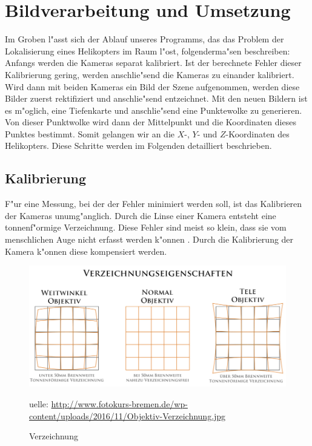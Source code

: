 \chapter{Bildverarbeitung und Umsetzung}
\label{cha:verarbeitungumsetzung}

Im Groben l"asst sich der Ablauf unseres Programms,
das das Problem der Lokalisierung eines Helikopters im Raum l"ost, folgenderma"sen beschreiben:\newline
Anfangs werden die Kameras separat kalibriert. Ist der berechnete Fehler dieser Kalibrierung gering, werden anschlie"send die Kameras zu einander kalibriert. Wird dann mit beiden Kameras ein Bild der Szene aufgenommen, werden diese Bilder zuerst rektifiziert und anschlie"send entzeichnet. Mit den neuen Bildern ist es m"oglich, eine Tiefenkarte und anschlie"send eine Punktewolke zu generieren. Von dieser Punktwolke wird dann der Mittelpunkt und die Koordinaten dieses Punktes bestimmt. Somit gelangen wir an die $X$-, $Y$- und $Z$-Koordinaten des Helikopters.\newline
Diese Schritte werden im Folgenden detailliert beschrieben.

\section{Kalibrierung}
\label{sec:kalibrierung}

F"ur eine Messung, bei der der Fehler minimiert werden soll, ist das Kalibrieren der Kameras unumg"anglich. Durch die Linse einer Kamera entsteht eine tonnenf"ormige Verzeichnung. Diese Fehler sind meist so klein, dass sie vom menschlichen Auge nicht erfasst werden k"onnen \cite{VZ} \cite{VZ1}. Durch die Kalibrierung der Kamera k"onnen diese kompensiert werden.\newline

\begin{figure}[H]
	\includegraphics[scale=0.45]{bilder/verzeichnung}
	\caption[Verzeichnung]{Verzeichnung}
	\label{fig:verzeichnung}
	\small  uelle: \url{http://www.fotokurs-bremen.de/wp-content/uploads/2016/11/Objektiv-Verzeichnung.jpg}
\end{figure}

